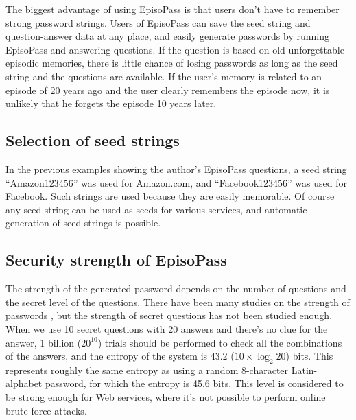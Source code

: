\documentclass[runningheads,a4paper]{llncs}
\begin{document}
The biggest advantage of using EpisoPass is that
users don't have to remember strong password strings.
%
Users of EpisoPass can save the seed string and question-answer data
at any place, and easily generate passwords by running
EpisoPass and answering questions.
If the question is based on old unforgettable episodic memories,
there is little chance of losing passwords
as long as the seed string and the questions are available.
If the user's memory is related to an episode of 20 years ago and the user clearly
remembers the episode now, it is unlikely that he forgets the episode 10 years later.

\subsection{Selection of seed strings}

In the previous examples showing the author's EpisoPass questions,
a seed string ``\textsf{Amazon123456}'' was used for Amazon.com, and
``\textsf{Facebook123456}'' was used for Facebook.
Such strings are used because they are easily memorable.
Of course any seed string can be used as seeds for various services,
and automatic generation of seed strings is possible.


\subsection{Security strength of EpisoPass}

The strength of the generated password depends on the number of
questions and the secret level of the questions.
%
There have been many studies on the strength of passwords
\cite{Hayashi:2011:DSP:1978942.1979326}%
\cite{Komanduri:2011:PPM:1978942.1979321}, %
but the strength of secret questions has not been studied enough.
%
When we use 10 secret questions with 20 answers and
there's no clue for the answer,
1 billion ($20^{10}$) trials should be performed to check
all the combinations of the answers,
and the entropy of the system is 43.2 ($10 \times \log_2 20$) bits.  %
%
This represents roughly the same entropy as using a random 8-character Latin-alphabet
password, for which the entropy is 45.6 bits.
This level is considered to be strong enough for Web services,
where it's not possible to perform online brute-force attacks\cite{Florencio:2007:SWP:1361419.1361429}.
\end{document}
